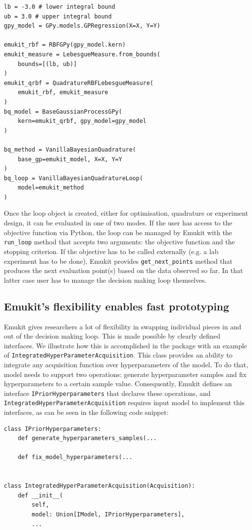 \begin{verbatim}
lb = -3.0 # lower integral bound
ub = 3.0 # upper integral bound
gpy_model = GPy.models.GPRegression(X=X, Y=Y)

emukit_rbf = RBFGPy(gpy_model.kern)
emukit_measure = LebesgueMeasure.from_bounds(
    bounds=[(lb, ub)]
)
emukit_qrbf = QuadratureRBFLebesgueMeasure(
    emukit_rbf, emukit_measure
)
bq_model = BaseGaussianProcessGPy(
    kern=emukit_qrbf, gpy_model=gpy_model
)

bq_method = VanillaBayesianQuadrature(
    base_gp=emukit_model, X=X, Y=Y
)
bq_loop = VanillaBayesianQuadratureLoop(
    model=emukit_method
)
\end{verbatim}

Once the loop object is created, either for optimisation, quadrature or experiment design, it can be evaluated in one of two modes. If the user has access to the objective function via Python, the loop can be managed by Emukit with the \texttt{run\_loop} method that accepts two arguments: the objective function and the stopping criterion. If the objective has to be called externally (e.g. a lab experiment has to be done), Emukit provides \texttt{get\_next\_points} method that produces the next evaluation point(s) based on the data observed so far. In that latter case user has to manage the decision making loop themselves.

\subsection{Emukit's flexibility enables fast prototyping}
Emukit gives researchers a lot of flexibility in swapping individual pieces in and out of the decision making loop. This is made possible by clearly defined interfaces. We illustrate how this is accomplished in the package with an example of \texttt{IntegratedHyperParameterAcquisition}. This class provides an ability to integrate any acquisition function over hyperparameters of the model. To do that, model needs to support two operations: generate hyperparameter samples and fix hyperparameters to a certain sample value. Consequently, Emukit defines an interface \texttt{IPriorHyperparameters} that declares these operations, and \texttt{IntegratedHyperParameterAcquisition} requires input model to implement this interfaces, as can be seen in the following code snippet:

\begin{verbatim}
class IPriorHyperparameters:
    def generate_hyperparameters_samples(...

    def fix_model_hyperparameters(...


class IntegratedHyperParameterAcquisition(Acquisition):
    def __init__(
        self,
        model: Union[IModel, IPriorHyperparameters],
        ...
\end{verbatim}

